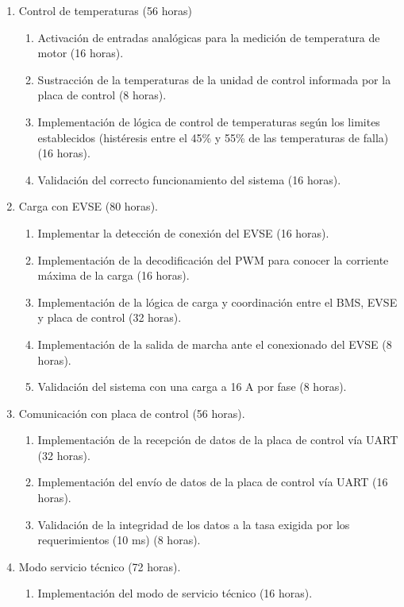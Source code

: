 \documentclass[
11pt, %
codirector, %
]{charter}
\begin{document}
\begin{enumerate}
	\item Control de temperaturas (56 horas)
	      \begin{enumerate}
		      \item Activación de entradas analógicas para la medición de temperatura de motor (16 horas).
		      \item Sustracción de la temperaturas de la unidad de control informada por la placa de control (8 horas).
		      \item Implementación de lógica de control de temperaturas según los limites establecidos (histéresis entre el 45\% y 55\% de las temperaturas de falla) (16 horas).
		      \item Validación del correcto funcionamiento del sistema (16 horas).
	      \end{enumerate}
	\item Carga con EVSE (80 horas).
	      \begin{enumerate}
		      \item Implementar la detección de conexión del EVSE (16 horas).
		      \item Implementación de la decodificación del PWM para conocer la corriente máxima de la carga (16 horas).
		      \item Implementación de la lógica de carga y coordinación entre el BMS, EVSE y placa de control (32 horas).
		      \item Implementación de la salida de marcha ante el conexionado del EVSE (8 horas).
		      \item Validación del sistema con una carga a 16 A por fase (8 horas).
	      \end{enumerate}
	\item Comunicación con placa de control (56 horas).
	      \begin{enumerate}
		      \item Implementación de la recepción de datos de la placa de control vía UART (32 horas).
		      \item Implementación del envío de datos de la placa de control vía UART (16 horas).
		      \item Validación de la integridad de los datos a la tasa exigida por los requerimientos (10 ms) (8 horas).
	      \end{enumerate}
	\item Modo servicio técnico (72 horas).
	      \begin{enumerate}
		      \item Implementación del modo de servicio técnico (16 horas).

\end{enumerate}
\end{enumerate}
\end{document}
